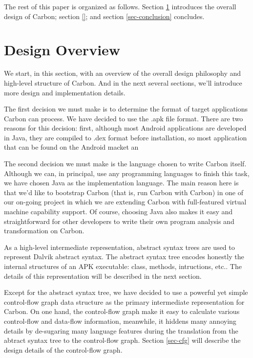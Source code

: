 \documentclass[preprint, cm]{sigplanconf}
\begin{document}
The rest of this paper is organized as follows. Section \ref{sec-design}
introduces the overall design of Carbon; section \ref{}; and section
\ref{sec-conclusion} concludes.

\section{Design Overview}\label{sec-design}
We start, in this section, with an overview of the overall
design philosophy and high-level structure of Carbon. And
in the next several sections, we'll introduce more design
and implementation details.

The first decision we must make is to determine the format
of target applications Carbon can process. We have decided
to use the .apk file format. There are two reasons for this
decision: first, although most Android applications
are developed in Java, they are compiled to .dex format
before installation, so most application that can be found
on the Android macket an 

The second decision we must make is the language chosen
to write Carbon itself. Although we can, in principal, use 
any programming languages to finish this task, we
have chosen Java as the implementation language. The main
reason here is that we'd like to bootstrap Carbon (that
is, run Carbon with Carbon) in one of our on-going project
in which we are extending
Carbon with full-featured virtual
machine capability support. Of course, choosing Java also makes
it easy and straightforward for other developers to
write their own program analysis and transformation
on Carbon.

As a high-level intermediate representation, abstract
syntax trees are used to represent Dalvik abstract
syntax. The abstract syntax tree encodes honestly
the internal structures of an APK executable: class, 
methods, intructions, etc.. The details of this
representation will be described in the next section.

Except for the abstract syntax tree, we have decided
to use a powerful yet simple control-flow graph
data structure as the primary intermediate representation for
Carbon. On one hand, the
control-flow graph make it easy to calculate various
control-flow and data-flow information, meanwhile, it
hiddens many annoying details by de-sugaring many
language features
during the translation from the abtract syntax tree
to the control-flow graph. Section \ref{sec-cfg} will
describe the design details of the control-flow graph.
\end{document}
